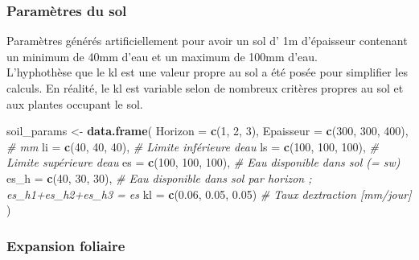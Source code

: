 \documentclass[
]{article}
\newenvironment{Shaded}{\begin{snugshade}}{\end{snugshade}}
\newcommand{\AttributeTok}[1]{\textcolor[rgb]{0.13,0.29,0.53}{#1}}
\newcommand{\CommentTok}[1]{\textcolor[rgb]{0.56,0.35,0.01}{\textit{#1}}}
\newcommand{\DecValTok}[1]{\textcolor[rgb]{0.00,0.00,0.81}{#1}}
\newcommand{\FloatTok}[1]{\textcolor[rgb]{0.00,0.00,0.81}{#1}}
\newcommand{\FunctionTok}[1]{\textcolor[rgb]{0.13,0.29,0.53}{\textbf{#1}}}
\newcommand{\NormalTok}[1]{#1}
\newcommand{\OtherTok}[1]{\textcolor[rgb]{0.56,0.35,0.01}{#1}}
\begin{document}
\subsubsection{Paramètres du sol}\label{paramuxe8tres-du-sol}

Paramètres générés artificiellement pour avoir un sol d' 1m d'épaisseur
contenant un minimum de 40mm d'eau et un maximum de 100mm d'eau.\\
L'hyphothèse que le kl est une valeur propre au sol a été posée pour
simplifier les calculs. En réalité, le kl est variable selon de nombreux
critères propres au sol et aux plantes occupant le sol.

\begin{Shaded}
\begin{Highlighting}[]
\NormalTok{soil\_params }\OtherTok{\textless{}{-}} \FunctionTok{data.frame}\NormalTok{(}
  \AttributeTok{Horizon     =} \FunctionTok{c}\NormalTok{(}\DecValTok{1}\NormalTok{, }\DecValTok{2}\NormalTok{, }\DecValTok{3}\NormalTok{),}
  \AttributeTok{Epaisseur   =} \FunctionTok{c}\NormalTok{(}\DecValTok{300}\NormalTok{, }\DecValTok{300}\NormalTok{, }\DecValTok{400}\NormalTok{),   }\CommentTok{\# mm}
  \AttributeTok{li          =} \FunctionTok{c}\NormalTok{(}\DecValTok{40}\NormalTok{,  }\DecValTok{40}\NormalTok{,  }\DecValTok{40}\NormalTok{),    }\CommentTok{\# Limite inférieure d\textquotesingle{}eau}
  \AttributeTok{ls          =} \FunctionTok{c}\NormalTok{(}\DecValTok{100}\NormalTok{, }\DecValTok{100}\NormalTok{, }\DecValTok{100}\NormalTok{),   }\CommentTok{\# Limite supérieure d\textquotesingle{}eau}
  \AttributeTok{es          =} \FunctionTok{c}\NormalTok{(}\DecValTok{100}\NormalTok{, }\DecValTok{100}\NormalTok{, }\DecValTok{100}\NormalTok{),   }\CommentTok{\# Eau disponible dans sol (= sw)}
  \AttributeTok{es\_h        =} \FunctionTok{c}\NormalTok{(}\DecValTok{40}\NormalTok{, }\DecValTok{30}\NormalTok{, }\DecValTok{30}\NormalTok{),      }\CommentTok{\# Eau disponible dans sol par horizon ; es\_h1+es\_h2+es\_h3 = es}
  \AttributeTok{kl          =} \FunctionTok{c}\NormalTok{(}\FloatTok{0.06}\NormalTok{, }\FloatTok{0.05}\NormalTok{, }\FloatTok{0.05}\NormalTok{) }\CommentTok{\# Taux d\textquotesingle{}extraction [mm/jour]}
\NormalTok{)}
\end{Highlighting}
\end{Shaded}

\subsubsection{Expansion foliaire}\label{expansion-foliaire}
\end{document}
